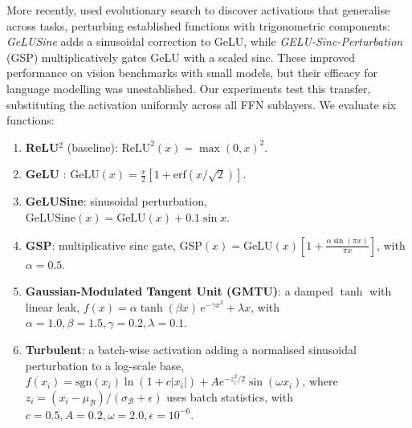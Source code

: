 More recently, \textcite{vitvitskyi2026mininggeneralizableactivationfunctions} used evolutionary search to discover activations that generalise across tasks, perturbing established functions with trigonometric components: \textit{GeLUSine} adds a sinusoidal correction to GeLU, while \textit{GELU-Sinc-Perturbation} (GSP) multiplicatively gates GeLU with a scaled sinc. These improved performance on vision benchmarks with small models, but their efficacy for language modelling was unestablished. Our experiments test this transfer, substituting the activation uniformly across all FFN sublayers. We evaluate six functions:
\begin{enumerate}\setlength{\itemsep}{1pt}\setlength{\parskip}{0pt}
    \item \textbf{ReLU\(^2\)} (baseline): $\mathrm{ReLU}^2(x) = \max(0,x)^2$.
    \item \textbf{GeLU} \parencite{hendrycks2016gelu}: $\mathrm{GeLU}(x) = \tfrac{x}{2}\!\left[1 + \mathrm{erf}(x/\sqrt{2})\right]$.
    \item \textbf{GeLUSine}: sinusoidal perturbation, $\mathrm{GeLUSine}(x) = \mathrm{GeLU}(x) + 0.1\sin x$.
    \item \textbf{GSP}: multiplicative sinc gate, $\mathrm{GSP}(x) = \mathrm{GeLU}(x)\!\left[1 + \tfrac{\alpha\sin(\pi x)}{\pi x}\right]$, with $\alpha{=}0.5$.
    \item \textbf{Gaussian-Modulated Tangent Unit (GMTU)}: a damped $\tanh$ with linear leak, $f(x) = \alpha\tanh(\beta x)\,e^{-\gamma x^2} + \lambda x$, with $\alpha{=}1.0,\beta{=}1.5,\gamma{=}0.2,\lambda{=}0.1$.
    \item \textbf{Turbulent}: a batch-wise activation adding a normalised sinusoidal perturbation to a log-scale base, $f(x_i) = \mathrm{sgn}(x_i)\ln(1+c|x_i|) + Ae^{-z_i^2/2}\sin(\omega x_i)$, where $z_i = (x_i - \mu_\mathcal{B})/(\sigma_\mathcal{B}+\epsilon)$ uses batch statistics, with $c{=}0.5,A{=}0.2,\omega{=}2.0,\epsilon{=}10^{-6}$.
\end{enumerate}




